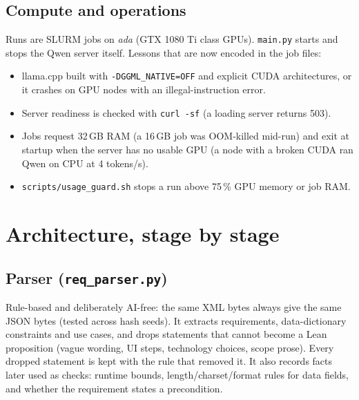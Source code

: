 \documentclass[11pt,a4paper]{article}
\newcommand{\code}[1]{\texttt{#1}}
\newcommand{\file}[1]{\texttt{#1}}
\begin{document}
\subsection{Compute and operations}
Runs are SLURM jobs on \emph{ada} (GTX 1080 Ti class GPUs). \file{main.py} starts and stops the
Qwen server itself. Lessons that are now encoded in the job files:
\begin{itemize}
  \item llama.cpp built with \code{-DGGML\_NATIVE=OFF} and explicit CUDA architectures, or it
        crashes on GPU nodes with an illegal-instruction error.
  \item Server readiness is checked with \code{curl -sf} (a loading server returns 503).
  \item Jobs request 32\,GB RAM (a 16\,GB job was OOM-killed mid-run) and exit at startup when
        the server has no usable GPU (a node with a broken CUDA ran Qwen on CPU at 4 tokens/s).
  \item \file{scripts/usage\_guard.sh} stops a run above 75\,\% GPU memory or job RAM.
\end{itemize}

\section{Architecture, stage by stage}

\subsection{Parser (\file{req\_parser.py})}
Rule-based and deliberately AI-free: the same XML bytes always give the same JSON bytes
(tested across hash seeds). It extracts requirements, data-dictionary constraints and use
cases, and drops statements that cannot become a Lean proposition (vague wording, UI steps,
technology choices, scope prose). Every dropped statement is kept with the rule that removed
it. It also records facts later used as checks: runtime bounds, length/charset/format rules
for data fields, and whether the requirement states a precondition.
\end{document}
